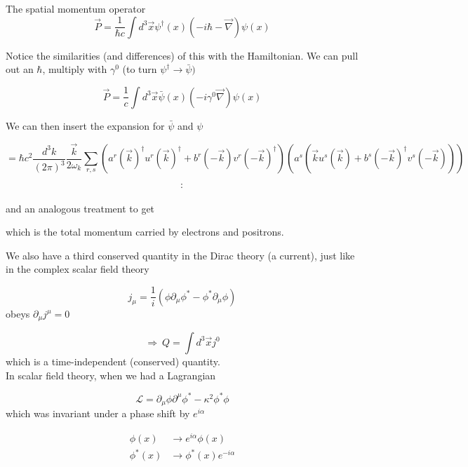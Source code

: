 \documentclass[11pt]{article}
\newcommand{\lag}{\mathcal{L}}
\begin{document}
	\begin{center}
	\end{center}
	
	The spatial momentum operator \[ \vec{P} = \frac{1}{\hbar c}\int d^3\vec{x} \psi^\dagger(x) (-i\hbar -\vec{\nabla}) \psi(x)\]
	
	Notice the similarities (and differences) of this with the Hamiltonian.
	We can pull out an $\hbar$, multiply with $\gamma^0$ (to turn $\psi^\dagger \to \bar{\psi})$
	
	\[ \vec{P} = \frac{1}{c}\int d^3\vec{x} \bar{\psi}(x)(-i\gamma^0 \vec{\nabla}) \psi(x) \]
	
	We can then insert the expansion for $\bar{\psi}$ and $\psi$
	
	\[ = \hbar c^2 \frac{d^3k}{(2\pi)^3} \frac{\vec{k}}{2\omega_k} \sum_{r,s} (a^r(\vec{k})^\dagger u^r(\vec{k})^\dagger + b^r(-\vec{k}) v^r(-\vec{k})^\dagger)(a^s(\vec{k}u^s(\vec{k}) + b^s(-\vec{k})^\dagger v^s(-\vec{k})))\]
	
	$$:$$\\
	
	and an analogous treatment to get
	
	\begin{center}
	\end{center}
which is the total momentum carried by electrons and positrons.
	
	We also have a third conserved quantity in the Dirac theory (a current), just like in the complex scalar field theory
	
	\[ j_\mu = \frac{1}{i} (\phi \partial_\mu \phi^* - \phi^* \partial_\mu \phi)\]
	obeys $\partial_\mu j^\mu = 0$
	
	\[ \Rightarrow\ Q = \int d^3\vec{x} j^0\]
	which is a time-independent (conserved) quantity.\\
	
	
	In scalar field theory, when we had a Lagrangian
	
	\[ \lag = \partial_\mu \phi \partial^\mu \phi^* - \kappa^2 \phi^* \phi\]
	which was invariant under a phase shift by $e^{i\alpha}$
	
	\begin{align*}
		\phi(x) &\to e^{i\alpha} \phi(x)\\
		\phi^*(x) &\to \phi^*(x) e^{-i\alpha}
	\end{align*}
\end{document}
